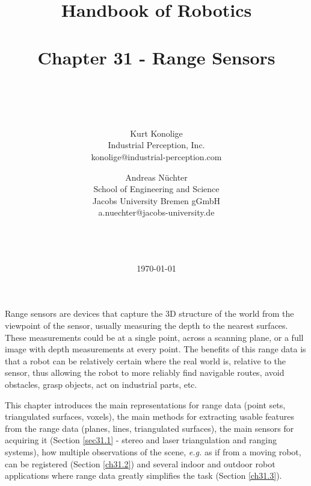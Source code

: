\documentclass[twocolumn,oneside]{book}
\begin{document}
\title{\LARGE{Handbook of Robotics\\
~\\
Chapter 31 - Range Sensors}\\
~\\
~}

\author{ %
Kurt Konolige\\
Industrial Perception, Inc.\\
konolige@industrial-perception.com\\
\and
Andreas N{\"u}chter\\
School of Engineering and Science \\
Jacobs University Bremen gGmbH \\
a.nuechter@jacobs-university.de \\
\\
\\
\\
}

\date{\today}

\maketitle


\tableofcontents


\setcounter{page}{1}

\setcounter{chapter}{31}

Range sensors are devices that capture the 3D structure of the world
from the viewpoint of the sensor, usually measuring the depth to the
nearest surfaces. These measurements could be at a single point,
across a scanning plane, or a full image with depth measurements at
every point.
The benefits of this range data is that a robot can be relatively 
certain where the real world is, relative to the sensor, thus allowing
the robot to more reliably find navigable routes, avoid obstacles,
grasp objects, act on industrial parts, etc.

This chapter introduces the main representations for range data 
(point sets, triangulated surfaces, voxels), the main methods 
for extracting usable features from the range data (planes, lines, triangulated surfaces),
the main sensors for acquiring it (Section \ref{sec31.1} -
stereo and laser triangulation and ranging systems),
how multiple observations of the scene, {\it e.g.} as if from a 
moving robot, can be registered (Section \ref{ch31.2})
and several indoor and outdoor robot applications where
range data greatly simplifies the task (Section \ref{ch31.3}).
\end{document}
